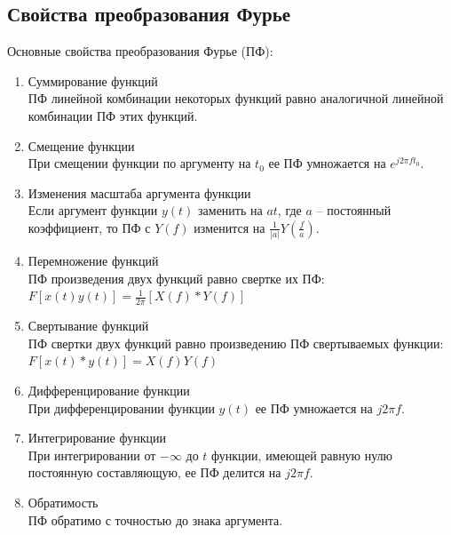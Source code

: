 \documentclass[a4paper]{article}
\begin{document}
\subsection{Свойства преобразования Фурье}
Основные свойства преобразования Фурье (ПФ):
\begin{enumerate}
	\item Суммирование функций\\
    ПФ линейной комбинации некоторых функций равно аналогичной линейной комбинации ПФ этих функций.
    \item Смещение функции\\
    При смещении функции по аргументу на $t_0$ ее ПФ умножается на $e^{j2{\pi}ft_0}$.
    \item Изменения масштаба аргумента функции\\
    Если аргумент функции $y(t)$ заменить на $at$, где $a$ -- постоянный коэффициент, то ПФ с $Y(f)$ изменится на $\frac{1}{|a|}Y(\frac{f}{a})$.
    \item Перемножение функций\\
    ПФ произведения двух функций равно свертке их ПФ:
    $F[x(t)y(t)]={\frac{1}{2{\pi}}}[X(f)*Y(f)]$
    \item Свертывание функций\\
    ПФ свертки двух функций равно произведению ПФ свертываемых функции: $F[x(t)*y(t)]=X(f)Y(f)$
    \item Дифференцирование функции\\
    При дифференцировании функции $y(t)$ ее ПФ умножается на $j2{\pi}f$.
    \item Интегрирование функции\\
    При интегрировании от $-{\infty}$ до $t$ функции, имеющей равную нулю постоянную составляющую, ее ПФ делится на $j2{\pi}f$.
    \item Обратимость\\
    ПФ обратимо с точностью до знака аргумента.
\end{enumerate}
\end{document}
